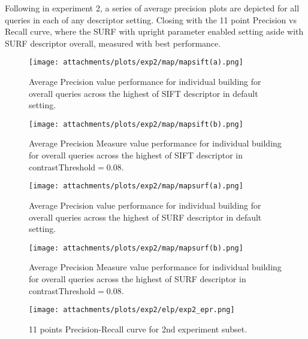       Following in experiment 2, a series of average precision plots are depicted for all queries
      in each of any descriptor setting.
      Closing with the 11 point Precision vs Recall curve, where the SURF with upright parameter enabled setting aside with SURF descriptor overall, measured with best performance.
           \begin{figure}[ht!]  %
              \centering
              \texttt{[image: attachments/plots/exp2/map/mapsift(a).png]}
              \caption{Average Precision value performance for individual building for overall queries across the highest of SIFT descriptor in default setting.}
              \label{fig:exp2_sifta_map}
            \end{figure}
            \newpage
            \begin{figure}[ht!]
              \centering
              \texttt{[image: attachments/plots/exp2/map/mapsift(b).png]}
              \caption{Average Precision Measure value performance for individual building for overall queries across the highest of SIFT descriptor in contrastThreshold$=$0.08.}
              \label{fig:exp2_siftb_map}
            \end{figure} 
            \begin{figure}[H]  %
              \centering
              \texttt{[image: attachments/plots/exp2/map/mapsurf(a).png]}
              \caption{Average Precision value performance for individual building for overall queries across the highest of SURF descriptor in default setting.}
              \label{fig:exp2_surfa_map}
            \end{figure}
            
	    \begin{figure}[t!] %
              \centering
              \texttt{[image: attachments/plots/exp2/map/mapsurf(b).png]}
              \caption{Average Precision Measure value performance for individual building for overall queries across the highest of SURF descriptor in contrastThreshold$=$0.08.}
              \label{fig:exp2_surfb_map}              
	    \end{figure}
	    
            \begin{figure}[H]
              \centering
              \texttt{[image: attachments/plots/exp2/elp/exp2\_epr.png]}
              \caption{11 points Precision-Recall curve for 2nd experiment subset.}
              \label{fig:exp1_bestmap}
            \end{figure}

